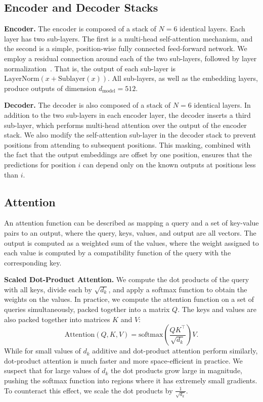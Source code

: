 \documentclass[conference]{IEEEtran}
\begin{document}
\subsection{Encoder and Decoder Stacks}
\textbf{Encoder.} The encoder is composed of a stack of $N = 6$ identical layers.
Each layer has two sub-layers. The first is a multi-head self-attention mechanism,
and the second is a simple, position-wise fully connected feed-forward network. We
employ a residual connection around each of the two sub-layers, followed by layer
normalization~\cite{ba2016}. That is, the output of each sub-layer is
$\mathrm{LayerNorm}(x + \mathrm{Sublayer}(x))$. All sub-layers, as well as the
embedding layers, produce outputs of dimension $d_{\text{model}} = 512$.

\textbf{Decoder.} The decoder is also composed of a stack of $N = 6$ identical
layers. In addition to the two sub-layers in each encoder layer, the decoder
inserts a third sub-layer, which performs multi-head attention over the output of
the encoder stack. We also modify the self-attention sub-layer in the decoder
stack to prevent positions from attending to subsequent positions. This masking,
combined with the fact that the output embeddings are offset by one position,
ensures that the predictions for position $i$ can depend only on the known outputs
at positions less than $i$.

\subsection{Attention}
An attention function can be described as mapping a query and a set of key-value
pairs to an output, where the query, keys, values, and output are all vectors. The
output is computed as a weighted sum of the values, where the weight assigned to
each value is computed by a compatibility function of the query with the
corresponding key.

\textbf{Scaled Dot-Product Attention.} We compute the dot products of the query
with all keys, divide each by $\sqrt{d_k}$, and apply a softmax function to obtain
the weights on the values. In practice, we compute the attention function on a set
of queries simultaneously, packed together into a matrix $Q$. The keys and values
are also packed together into matrices $K$ and $V$:
\begin{equation}
\mathrm{Attention}(Q, K, V) = \mathrm{softmax}\!\left(\frac{QK^{\top}}{\sqrt{d_k}}\right)V.
\label{eq:sdpa}
\end{equation}
While for small values of $d_k$ additive and dot-product attention perform
similarly, dot-product attention is much faster and more space-efficient in
practice. We suspect that for large values of $d_k$ the dot products grow large in
magnitude, pushing the softmax function into regions where it has extremely small
gradients. To counteract this effect, we scale the dot products by
$\frac{1}{\sqrt{d_k}}$.
\end{document}
